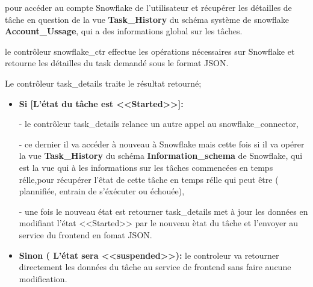     pour accéder au compte Snowflake de l'utilisateur et récupérer les détailles de tâche en question de la vue \textbf{Task\_History} du schéma système de snowflake \textbf{Account\_Ussage}, qui a des informations global sur les tâches.
    \par le contrôleur snowflake\_ctr effectue les opérations nécessaires sur Snowflake et retourne les détailles du task demandé sous le format JSON.
    \par Le contrôleur task\_details traite le résultat retourné; 
    \begin{itemize}
        \item \textbf{Si [L'état du tâche est <<Started>>]:} 
        \par - le contrôleur task\_details relance un autre appel au snowflake\_connector,
        \par - ce dernier il va accéder à nouveau à Snowflake mais cette fois si il va opérer la vue \textbf{Task\_History} du schéma \textbf{Information\_schema} de Snowflake, qui est la vue qui à les informations sur les tâches commencées en temps rélle,pour récupérer l'êtat de cette tâche en temps rélle qui peut être ( plannifiée, entrain de s'éxécuter ou échouée),
        \par - une fois le nouveau état est retourner task\_details met à jour les données en modifiant l'état <<Started>> par le nouveau ètat du tâche et l'envoyer au service du frontend en fomat JSON.
        \item \textbf{Sinon ( L'état sera <<suspended>>):} le controleur va retourner directement les données du tâche au service de frontend sans faire aucune modification.
    \end{itemize}

